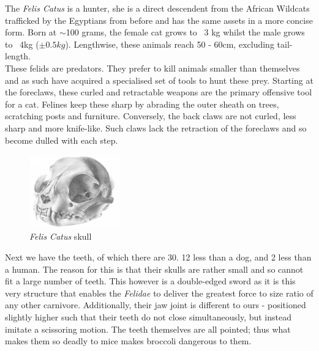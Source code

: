 \documentclass{article}
\begin{document}
\fancyfoot[L]{}


\noindent{}The \emph{Felis Catus} is a hunter, she is a direct descendent from the African Wildcats trafficked by the Egyptians from before and has the same assets in a more concise form. Born at $\sim$100 grams, the female cat grows to ~3 kg whilst the male grows to ~4kg (\(\pm0.5kg\)). Lengthwise, these animals reach 50 - 60cm, excluding tail-length.\\

These \gls{felid}s are predators. They prefer to kill animals smaller than themselves and as such have acquired a specialised set of tools to hunt these prey. Starting at the foreclaws, these curled and retractable weapons are the primary offensive tool for a cat. Felines keep these sharp by abrading the outer sheath on trees, scratching posts and furniture. Conversely, the back claws are not curled, less sharp and more knife-like. Such claws lack the retraction of the foreclaws and so become dulled with each step.\\

\begin{figure}
    \includegraphics[width=0.35\textwidth]{img/cat-skull.png}
    \caption{\emph{Felis Catus} skull}
\end{figure}


Next we have the teeth, of which there are 30. 12 less than a dog, and 2 less than a human. The reason for this is that their skulls are rather small and so cannot fit a large number of teeth. This however is a double-edged sword as it is this very structure that enables the \emph{Felidae} to deliver the greatest force to size ratio of any other carnivore. Additionally, their jaw joint is different to ours - positioned slightly higher such that their teeth do not close simultaneously, but instead imitate a scissoring motion. The teeth themselves are all pointed; thus what makes them so deadly to mice makes broccoli dangerous to them.\\
\end{document}
